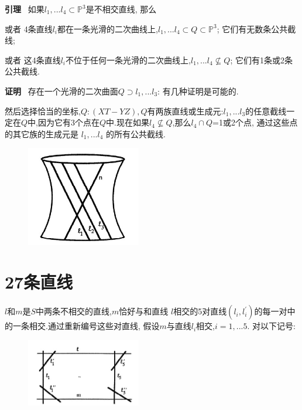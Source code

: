 \documentclass[UTF8]{book}
\begin{document}
	\textbf{引理} \ 如果$l_{1},...l_{4}\subset \mathbb{P}^{3}$是不相交直线, 那么
	
	或者 4条直线$l_{i}$都在一条光滑的二次曲线上,$l_{1},...l_{4}\subset Q \subset \mathbb{P}^{3}$; 它们有无数条公共截线;
	
	或者 这4条直线$l_{i}$不位于任何一条光滑的二次曲线上,$l_{1},...l_{4}\nsubseteq Q $; 它们有1条或2条公共截线.
	
	\textbf{证明} \ 存在一个光滑的二次曲面$Q\supset l_{1},...l_{3}$: 有几种证明是可能的.
	
	然后选择恰当的坐标,$ Q:(XT - YZ),Q $有两族直线或生成元:$l_{1},...l_{3}$的任意截线一定在$ Q $中,因为它有3个点在$ Q $中.现在如果$l_{4}\nsubseteq Q$,那么$l_{4}\cap Q$={1或2个点}, 通过这些点的其它族的生成元是 $l_{1},...l_{4}$ 的所有公共截线.
	
	\begin{figure}[H]
		\centering
		\includegraphics[width=5cm]{109.jpg}\\
	\end{figure}
	\section{27条直线}
	$l$和$ m $是$ S $中两条不相交的直线,$  m $恰好与和直线 $l$相交的5对直线$(l_{i},l^{'}_{i})$的每一对中的一条相交.通过重新编号这些对直线, 假设$ m $与直线$l_{i}$相交,$ i = 1,...5 $. 对以下记号:
	
	\begin{figure}[H]
		\centering
		\includegraphics[width=5cm]{1092.jpg}\\
	\end{figure}
	
\end{document}
